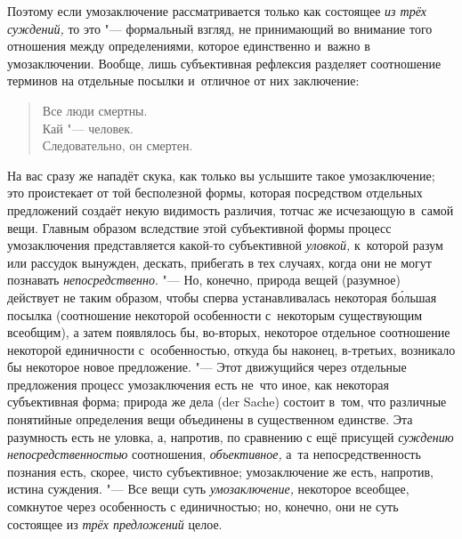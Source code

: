 Поэтому если умозаключение рассматривается только как
состоящее {\em из трёх суждений,}
то это "--- формальный взгляд, не принимающий во
внимание того отношения между определениями, которое единственно и~важно в
умозаключении. Вообще, лишь субъективная рефлексия разделяет соотношение
терминов на отдельные посылки и~отличное от них заключение:

\begin{verse}
Все люди смертны.\\
Кай "--- человек.\\
Следовательно, он смертен.
\end{verse}

На вас сразу же нападёт скука, как только вы услышите такое
умозаключение; это проистекает от той бесполезной формы, которая
посредством отдельных предложений создаёт некую видимость различия, тотчас
же исчезающую в~самой вещи. Главным образом вследствие этой субъективной
формы процесс умозаключения представляется какой-то субъективной
{\em уловкой,} к~которой разум или рассудок вынужден, дескать, прибегать
в тех случаях, когда они не могут познавать {\em непосредственно}.
"--- Но, конечно, природа вещей (разумное) действует не таким
образом, чтобы сперва устанавливалась некоторая б\'{о}льшая посылка
(соотношение некоторой особенности с~некоторым существующим всеобщим), а
затем появлялось бы, во-вторых, некоторое отдельное соотношение некоторой
единичности с~особенностью, откуда бы наконец, в-третьих, возникало бы
некоторое новое предложение. "--- \label{bkm:bm52a}Этот
движущийся через отдельные предложения процесс умозаключения есть
не~что иное, как некоторая субъективная форма; природа же дела (der Sache)
состоит в~том, что различные понятийные определения вещи объединены в
существенном единстве. Эта разумность есть не уловка, а, напротив, по сравнению
с ещё присущей {\em суждению непосредственностью} соотношения, {\em
объективное,} а~та непосредственность познания есть, скорее, чисто
субъективное; умозаключение же есть, напротив, истина суждения. "--- Все вещи
суть {\em умозаключение,} некоторое всеобщее, сомкнутое через особенность с
единичностью; но, конечно, они не суть состоящее из {\em трёх предложений}
целое.


